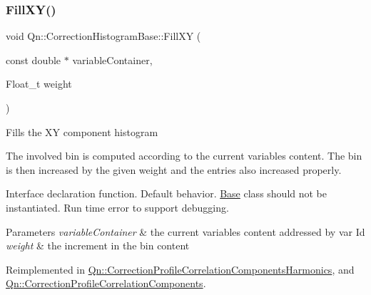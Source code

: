 \mbox{\label{classQn_1_1CorrectionHistogramBase_a3ede7e510526e205704ec78e7c7254a3}} 
\subsubsection{\texorpdfstring{Fill\+X\+Y()}{FillXY()}\hspace{0.1cm}{\footnotesize\ttfamily [1/2]}}
{\footnotesize\ttfamily void Qn\+::\+Correction\+Histogram\+Base\+::\+Fill\+XY (\begin{DoxyParamCaption}\item[{const double $\ast$}]{variable\+Container,  }\item[{Float\+\_\+t}]{weight }\end{DoxyParamCaption})\hspace{0.3cm}{\ttfamily [virtual]}}

Fills the XY component histogram

The involved bin is computed according to the current variables content. The bin is then increased by the given weight and the entries also increased properly.

Interface declaration function. Default behavior. \mbox{\hyperlink{classBase}{Base}} class should not be instantiated. Run time error to support debugging.


\begin{DoxyParams}{Parameters}
{\em variable\+Container} & the current variables content addressed by var Id \\
\hline
{\em weight} & the increment in the bin content \\
\hline
\end{DoxyParams}


Reimplemented in \mbox{\hyperlink{classQn_1_1CorrectionProfileCorrelationComponentsHarmonics_a59fc7f772621466f60cbf34a98c0174c}{Qn\+::\+Correction\+Profile\+Correlation\+Components\+Harmonics}}, and \mbox{\hyperlink{classQn_1_1CorrectionProfileCorrelationComponents_a05d2d17173f5a6aaccb4bd8cb9aece3a}{Qn\+::\+Correction\+Profile\+Correlation\+Components}}.

\mbox{\label{classQn_1_1CorrectionHistogramBase_a93a446798e53ea386ce0e3fc882abae8}} 
